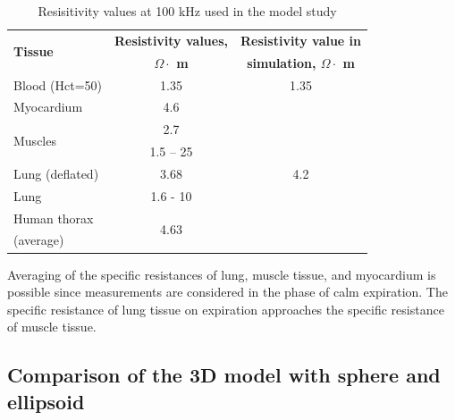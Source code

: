 \documentclass[conference]{IEEEtran}
\begin{document}
\begin{table}[htbp]
    \caption{Resisitivity values at  100 kHz used in the model study}
    \begin{center}
        \begin{tabular}{|l|c|c|}
            \hline
            \multirow{2}{*}{\textbf{Tissue}}              &     \textbf{Resistivity values,}      &    \textbf{Resistivity value in}  \\
            &   \textbf{$\Omega \cdot$ m}     &   \textbf{ simulation, $\Omega \cdot$ m} \\
            \hline
            Blood (Hct=50)           & 1.35\cite{Hill1975}           & 1.35      \\
            \hline
            Myocardium               & 4.6 \cite{Hasgall}       & \multirow{7}{*}{4.2}\\
            \cline{1-2}
            \multirow{2}{*}{Muscles} & 2.7 \cite{Hasgall}           &     \\
            \cline{2-2}
            & 1.5 – 25 \cite{Rush1963}           &   \\
            \cline{1-2}
            Lung (deflated)          & 3.68 \cite{Hasgall}     &         \\
            \cline{1-2}
            Lung                     & 1.6 - 10 \cite{Grimnes2008}       &    \\
            \cline{1-2}
            Human thorax & \multirow{2}{*}{4.63 \cite{Rush1963} }  &   \\
            (average)   & &   \\
            \hline
        \end{tabular}
        \label{tab:table}
    \end{center}
\end{table}


Averaging of the specific resistances of lung, muscle tissue, and myocardium is possible since measurements are considered in the phase of calm expiration.
The specific resistance of lung tissue on expiration approaches the specific resistance of muscle tissue.

\subsection{Comparison of the 3D model with sphere and ellipsoid}
\end{document}
